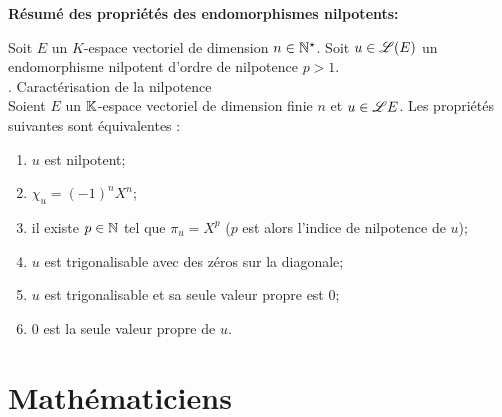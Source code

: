 \documentclass[
	a4paper, %
	fontsize=8pt, %
	twoside=true, %
	chapterentrydots=true, %
	numbers=noenddot, %
]{kaobook}
\begin{document}
\textbf{Résumé des propriétés des endomorphismes nilpotents:}

Soit $E$ un $K$-espace vectoriel de dimension $n \in \mathbb{N}^\star$. Soit $u \in \mathscr{L}(E)$ un endomorphisme nilpotent d'ordre de nilpotence $p > 1$. \\
\cite{objectif_agregation}. Caractérisation de la nilpotence \\
Soient $E$ un $\mathbb{K}$-espace vectoriel de dimension finie $n$ et $u \in \mathscr{L}{E}$. Les propriétés suivantes sont équivalentes :
\begin{enumerate}[label=(\roman*)]
    \item $u$ est nilpotent;
    \item $\chi_u = (-1)^n X^n$;
    \item il existe $p \in \mathbb{N}$ tel que $\pi_u = X^p$ ($p$ est alors l'indice de nilpotence de $u$);
    \item $u$ est trigonalisable avec des zéros sur la diagonale;
    \item $u$ est trigonalisable et sa seule valeur propre est $0$;
    \item $0$ est la seule valeur propre de $u$.
\end{enumerate}

\backmatter %

\thispagestyle{empty}
\chapter{Mathématiciens}
\begin{multicols}{2}
\small
\begin{itemize}[label=]
    
\end{itemize}
\end{multicols}

\printbibliography[heading=bibintoc, title=Références] %

\printindex %
\end{document}
